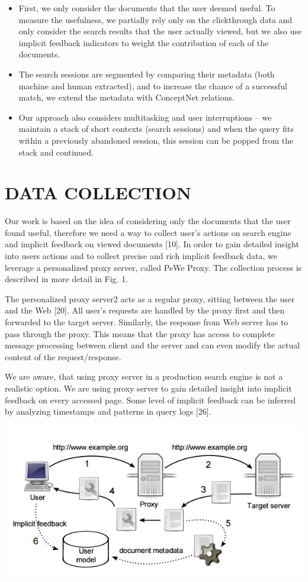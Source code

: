 \documentclass{acm_proc_article-sp} %
\begin{document}
\begin{itemize} 
	\item First, we only consider the documents that the user
	deemed useful. To measure the usefulness, we partially
	rely only on the clickthrough data and only consider
	the search results that the user actually viewed, but
	we also use implicit feedback indicators to weight the
	contribution of each of the documents.
	\item The search sessions are segmented by comparing their
	metadata (both machine and human extracted), and
	to increase the chance of a successful match, we extend
	the metadata with ConceptNet relations.
	\item Our approach also considers multitasking and user interruptions
	– we maintain a stack of short contexts
	(search sessions) and when the query fits within a previously
	abandoned session, this session can be popped
	from the stack and continued.
\end{itemize}

\section{DATA COLLECTION}

Our work is based on the idea of considering only the documents
that the user found useful, therefore we need a way
to collect user’s actions on search engine and implicit feedback
on viewed documents [10]. In order to gain detailed
insight into users actions and to collect precise and rich implicit
feedback data, we leverage a personalized proxy server,
called PeWe Proxy. The collection process is described in
more detail in Fig. 1.

The personalized proxy server2
acts as a regular proxy, sitting
between the user and the Web [20]. All user’s requests
are handled by the proxy first and then forwarded to the
target server. Similarly, the response from Web server has
to pass through the proxy. This means that the proxy has
access to complete message processing between client and
the server and can even modify the actual content of the
request/response.

We are aware, that using proxy server in a production search
engine is not a realistic option. We are using proxy server to
gain detailed insight into implicit feedback on every accessed
page. Some level of implicit feedback can be inferred by
analyzing timestamps and patterns in query logs [26].

\includegraphics{img-1.jpg}
\end{document}
